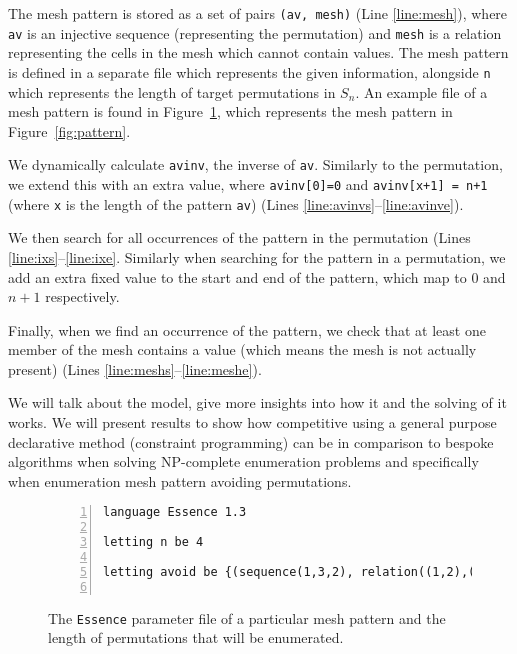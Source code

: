 \documentclass[11pt]{article}
\theoremstyle{plain}
\theoremstyle{definition}
\theoremstyle{remark}
\newcommand{\essence}{\texttt{Essence} }
\begin{document}
The mesh pattern is stored as a set of pairs \texttt{(av, mesh)} (Line \ref{line:mesh}), where \texttt{av} is an injective sequence (representing the permutation) and \texttt{mesh} is a relation representing the cells in the mesh which cannot contain values.
The mesh pattern is defined in a separate file which represents the given information, alongside \texttt{n} which represents the length of target permutations in $S_n$. 
An example file of a mesh pattern is found in Figure~\ref{fig:param}, which represents the mesh pattern in Figure~\ref{fig:pattern}.

We dynamically calculate \texttt{avinv}, the inverse of \texttt{av}. 
Similarly to the permutation, we extend this with an extra value, where \texttt{avinv[0]=0} and \texttt{avinv[x+1] = n+1} (where \texttt{x} is the length of the pattern \texttt{av}) (Lines \ref{line:avinvs}--\ref{line:avinve}). 

We then search for all occurrences of the pattern in the permutation (Lines \ref{line:ixs}--\ref{line:ixe}. 
Similarly when searching for the pattern in a permutation, we add an extra fixed value to the start and end of the pattern, which map to \(0\) and \(n+1\) respectively.

Finally, when we find an occurrence of the pattern, we check that at least one member of the mesh contains a value (which means the mesh is not actually present) (Lines \ref{line:meshs}--\ref{line:meshe}).

We will talk about the model, give more insights into how it and the solving of it works. 
We will present results to show how competitive using a general purpose declarative method (constraint programming) can be in comparison to bespoke algorithms when solving NP-complete enumeration problems and specifically when enumeration mesh pattern avoiding permutations.


\begin{figure}
 \begin{lstlisting}[numbers=left]
language Essence 1.3

letting n be 4

letting avoid be {(sequence(1,3,2), relation((1,2),(2,3),(3,0),(3,1)))}
    
\end{lstlisting}
\caption{The \essence parameter file of a particular mesh pattern and the length of permutations that will be enumerated.\label{fig:param}}
\end{figure}
\end{document}
